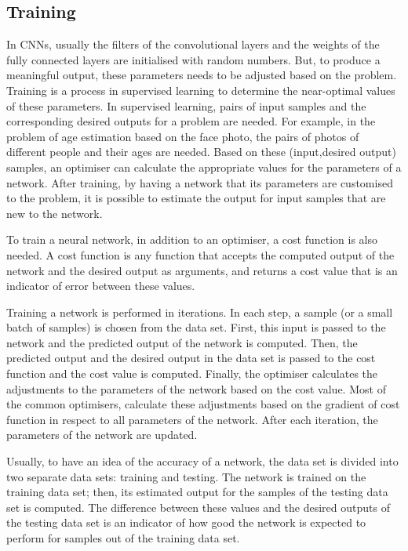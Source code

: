 \subsection{Training}

In CNNs, usually the filters of the convolutional layers and the weights of the fully connected layers are initialised with random numbers. But, to produce a meaningful output, these parameters needs to be adjusted based on the problem. Training is a process in supervised learning to determine the near-optimal values of these parameters. In supervised learning, pairs of input samples and the corresponding desired outputs for a problem are needed. For example, in the problem of age estimation based on the face photo, the pairs of photos of different people and their ages are needed. Based on these (input,desired output) samples, an optimiser can calculate the appropriate values for the parameters of a network. After training, by having a network that its parameters are customised to the problem, it is possible to estimate the output for input samples that are new to the network. 

To train a neural network, in addition to an optimiser, a cost function is also needed. A cost function is any function that accepts the computed output of the network and the desired output as arguments, and returns a cost value that is an indicator of error between these values. 

Training a network is performed in iterations. In each step, a sample (or a small batch of samples) is chosen from the data set. First, this input is passed to the network and the predicted output of the network is computed. Then, the predicted output and the desired output in the data set is passed to the cost function and the cost value is computed. Finally, the optimiser calculates the adjustments to the parameters of the network based on the cost value. Most of the common optimisers, calculate these adjustments based on the gradient of cost function in respect to all parameters of the network. After each iteration, the parameters of the network are updated. 

Usually, to have an idea of the accuracy of a network, the data set is divided into two separate data sets: training and testing. The network is trained on the training data set; then, its estimated output for the samples of the testing data set is computed. The difference between these values and the desired outputs of the testing data set is an indicator of how good the network is expected to perform for samples out of the training data set.

